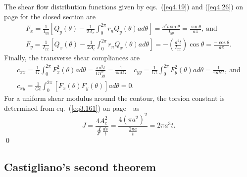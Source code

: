 \documentclass{AeroStructure-ERJohnson}
\begin{document}
\begin{example*}
The shear flow distribution functions given by eqs.~(\ref{eq4.19}) and (\ref{eq4.26}) on page \pageref{eq4.19} for the closed section are
\begin{gather*}
F_{x}=\frac{1}{I_{y y}}\left[Q_{y}(\theta)-\frac{1}{2 A_{c}} \int_{0}^{2 \pi} r_{n} Q_{y}(\theta) a d \theta\right]=\frac{a^{2} t \sin \theta}{I_{y y}}=\frac{\sin \theta}{a \pi}, \ \text{and}\tag{f}\\
F_{y}=\frac{1}{I_{x x}}\left[Q_{x}(\theta)-\frac{1}{2 A_{c}} \int_{0}^{2 \pi} r_{n} Q_{x}(\theta) a d \theta\right]=-\left(\frac{a^{2} t}{I_{x x}}\right) \cos \theta=\frac{-\cos \theta}{a \pi}.\tag{g}
\end{gather*}
Finally, the transverse shear compliances are
\begin{gather*}
c_{x x}=\frac{1}{G} \int_{0}^{2 \pi} F_{x}^{2}(\theta) a d \theta=\frac{\pi a^{5} t}{G I_{y y}^{2}}=\frac{1}{\pi a t G} \quad c_{y y}=\frac{1}{G t} \int_{0}^{2 \pi} F_{y}^{2}(\theta) a d \theta=\frac{1}{\pi a t G},\ \text{and} \tag{h}\\
c_{x y}=\frac{1}{G t} \int_{0}^{2 \pi}\left[F_{x}(\theta) F_{y}(\theta)\right] a d \theta=0.\tag{i}
\end{gather*}
For a uniform shear modulus around the contour, the torsion constant is determined from eq.~(\ref{eq3.161}) on page~\pageref{eq3.161}~as
\begin{equation*}
J=\frac{4 A_{c}^{2}}{\oint \frac{d s}{t}}=\frac{4\left(\pi a^{2}\right)^{2}}{\frac{2 \pi a}{t}}=2 \pi a^{3} t.\tag{j}
\end{equation*}\hfill\qed
\end{example*}

\vspace*{-1pc}

\subsection{Castigliano's second theorem}\label{sec6.2.1}
\end{document}
